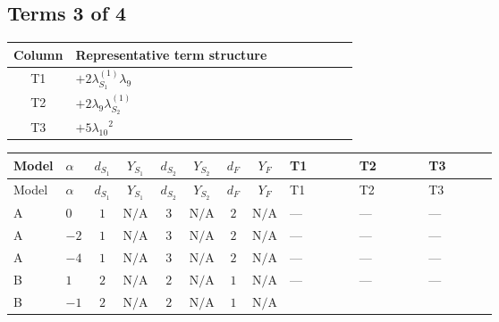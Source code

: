 \documentclass[8pt]{article}
\begin{document}
\begin{landscape}
\subsection*{Terms 3 of 4}
\begin{center}
\begin{tabular}{@{}c >{\raggedright\arraybackslash}p{0.82\linewidth}@{}}
\toprule
Column & Representative term structure \\
\midrule
T1 & \(\displaystyle +2 {\lambda_{S_1}^{(1)}} {\lambda_{9}}\) \\
\midrule
T2 & \(\displaystyle +2 {\lambda_{9}} {\lambda_{S_2}^{(1)}}\) \\
\midrule
T3 & \(\displaystyle +5 {\lambda_{10}}^2\) \\
\midrule
\bottomrule
\end{tabular}
\end{center}
\smallskip
\tiny
\begin{longtable}{@{}llcccccc >{\raggedright\arraybackslash}p{0.21\linewidth} >{\raggedright\arraybackslash}p{0.21\linewidth} >{\raggedright\arraybackslash}p{0.21\linewidth}@{}}
\toprule
Model & $\alpha$ & $d_{S_1}$ & $Y_{S_1}$ & $d_{S_2}$ & $Y_{S_2}$ & $d_F$ & $Y_F$ & T1 & T2 & T3 \\
\midrule
\endfirsthead
\toprule
Model & $\alpha$ & $d_{S_1}$ & $Y_{S_1}$ & $d_{S_2}$ & $Y_{S_2}$ & $d_F$ & $Y_F$ & T1 & T2 & T3 \\
\midrule
\endhead
A & $0$ & $1$ & $\text{N/A}$ & $3$ & $\text{N/A}$ & $2$ & $\text{N/A}$ & --- & --- & --- \\
\midrule
A & $-2$ & $1$ & $\text{N/A}$ & $3$ & $\text{N/A}$ & $2$ & $\text{N/A}$ & --- & --- & --- \\
\midrule
A & $-4$ & $1$ & $\text{N/A}$ & $3$ & $\text{N/A}$ & $2$ & $\text{N/A}$ & --- & --- & --- \\
\midrule
B & $1$ & $2$ & $\text{N/A}$ & $2$ & $\text{N/A}$ & $1$ & $\text{N/A}$ & --- & --- & --- \\
\midrule
B & $-1$ & $2$ & $\text{N/A}$ & $2$ & $\text{N/A}$ & $1$ & $\text{N/A}$ & \scriptsize\adjustbox{max width=\linewidth}{$\begin{gathered} +2 {\lambda_{S_1}^{(1)}} {\lambda_{9}}\end{gathered}$} & \scriptsize\adjustbox{max width=\linewidth}{$\begin{gathered} +2 {\lambda_{9}} {\lambda_{S_2}^{(1)}}\end{gathered}$} & \scriptsize\adjustbox{max width=\linewidth}{$\begin{gathered} +5 {\lambda_{10}}^2 \\ +5 {\lambda_{11}}^2\end{gathered}$} \\

\end{longtable}
\end{landscape}
\end{document}
